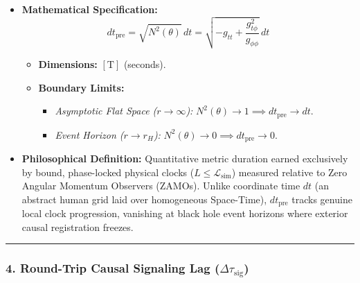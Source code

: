 \documentclass[
]{article}
\providecommand{\tightlist}{%
  \setlength{\itemsep}{0pt}\setlength{\parskip}{0pt}}
\begin{document}
\begin{itemize}
\tightlist
\item
  \textbf{Mathematical Specification:}
  \[dt_{\mathrm{pre}} = \sqrt{N^2(\theta)} \, dt = \sqrt{-g_{tt} + \frac{g_{t\phi}^2}{g_{\phi\phi}}} \, dt\]

  \begin{itemize}
  \tightlist
  \item
    \textbf{Dimensions:} \([\text{T}]\) (seconds).
  \item
    \textbf{Boundary Limits:}

    \begin{itemize}
    \tightlist
    \item
      \emph{Asymptotic Flat Space (\(r \to \infty\)):}
      \(N^2(\theta) \to 1 \implies dt_{\mathrm{pre}} \to dt\).
    \item
      \emph{Event Horizon (\(r \to r_H\)):}
      \(N^2(\theta) \to 0 \implies dt_{\mathrm{pre}} \to 0\).
    \end{itemize}
  \end{itemize}
\item
  \textbf{Philosophical Definition:} Quantitative metric duration earned
  exclusively by bound, phase-locked physical clocks
  (\(L \le \mathcal{L}_{\mathrm{sim}}\)) measured relative to Zero
  Angular Momentum Observers (ZAMOs). Unlike coordinate time \(dt\) (an
  abstract human grid laid over homogeneous Space-Time),
  \(dt_{\mathrm{pre}}\) tracks genuine local clock progression,
  vanishing at black hole event horizons where exterior causal
  registration freezes.
\end{itemize}

\begin{center}\rule{0.5\linewidth}{0.5pt}\end{center}

\subsubsection{\texorpdfstring{4. Round-Trip Causal Signaling Lag
(\(\Delta\tau_{\mathrm{sig}}\))}{4. Round-Trip Causal Signaling Lag (\textbackslash Delta\textbackslash tau\_\{\textbackslash mathrm\{sig\}\})}}\label{round-trip-causal-signaling-lag-deltatau_mathrmsig}
\end{document}
